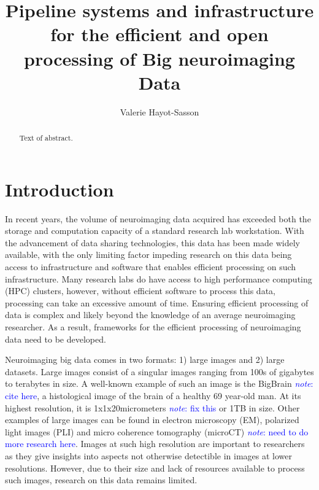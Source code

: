 \documentclass{report}
\newcommand{\note}[1]{\textcolor{blue}{\textit{note}: #1}}
\begin{document}
 
    \title{Pipeline systems and infrastructure for the efficient
            and open processing of Big neuroimaging Data} 
    \author{Valerie Hayot-Sasson}
    \maketitle 
    
    \begin{abstract} Text of abstract.  
    \end{abstract} 
    \tableofcontents
    \chapter{Introduction}
    In recent years, the volume of neuroimaging data acquired has exceeded
    both the storage and computation capacity of a standard research 
    lab workstation. With the advancement of data sharing technologies, this 
    data has been made widely available, with the only limiting factor impeding
    research on this data being access to infrastructure and software that 
    enables efficient processing on such infrastructure. Many research labs do
    have access to high performance computing (HPC) clusters, however, without
    efficient software to process this data, processing can take an excessive 
    amount of time. Ensuring efficient processing of data is complex and 
    likely beyond the knowledge of an average neuroimaging researcher. As a 
    result, frameworks for the efficient processing of neuroimaging data need
    to be developed.

    Neuroimaging big data comes in two formats: 1) large images and 2) large 
    datasets. Large images consist of a singular images ranging from 100s of
    gigabytes to terabytes in size. A well-known example of such an image is the
    BigBrain \note{cite here}, a histological image of the brain of a 
    healthy 69 year-old man. 
    At its highest resolution, it is 1x1x20micrometers \note{fix this} or 1TB in
    size. Other examples of large images can be found in electron microscopy 
    (EM), polarized light images (PLI) and micro coherence tomography (microCT)
    \note{need to do more research here}. Images at such high resolution are
    important to researchers as they give insights into aspects not otherwise
    detectible in images at lower resolutions. However, due to their size and 
    lack of resources available to process such images, research on this data 
    remains limited.
\end{document}

